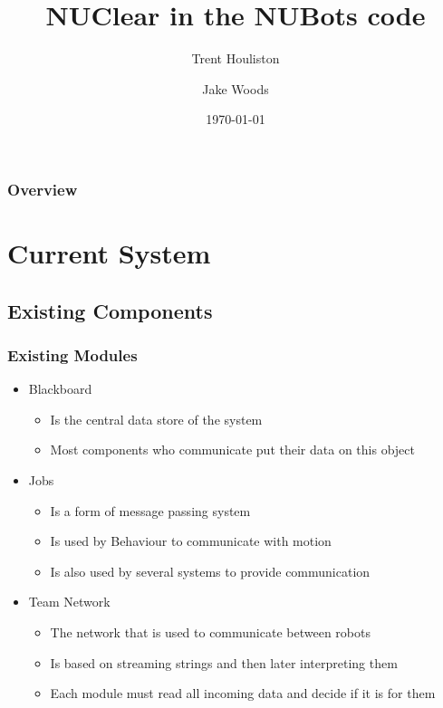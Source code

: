 \documentclass{beamer}
\title[Short title]{NUClear in the NUBots code}
\author{
    Trent Houliston \and Jake Woods
}
\institute[UoN]
{
    University of Newcastle \\ %
    \medskip
    \textit{Trent.Houliston@uon.edu.au, Jake.f.woods@gmail.com} %
}
\date{\today}
\begin{document}
\begin{frame}
    \titlepage %
\end{frame}


\begin{frame}
    \frametitle{Overview}
    \tableofcontents
\end{frame}

\section{Current System}
\subsection{Existing Components}
\begin{frame}
    \frametitle{Existing Modules}
	\begin{itemize}
		\item Blackboard
			\begin{itemize}
				\item Is the central data store of the system
				\item Most components who communicate put their data on this object
			\end{itemize}
		\item Jobs
			\begin{itemize}
				\item Is a form of message passing system
				\item Is used by Behaviour to communicate with motion
				\item Is also used by several systems to provide communication
			\end{itemize}
		\item Team Network
			\begin{itemize}
				\item The network that is used to communicate between robots
				\item Is based on streaming strings and then later interpreting them
				\item Each module must read all incoming data and decide if it is for them
			\end{itemize}
	\end{itemize}
\end{frame}
\end{document}
